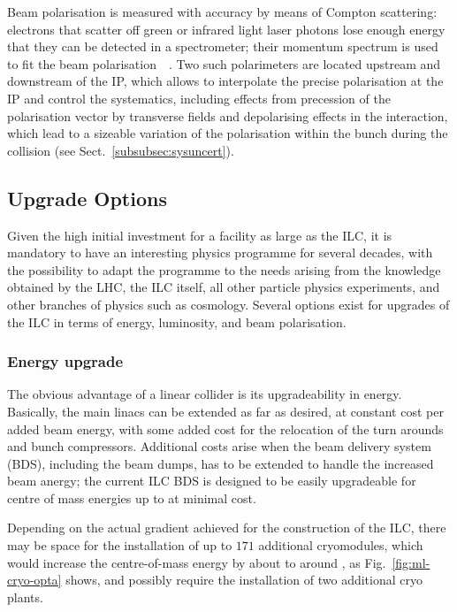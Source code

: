Beam polarisation is measured with  accuracy by means of Compton scattering: electrons that scatter off green or infrared light laser photons lose enough energy that they can be detected in a spectrometer; their momentum spectrum is used to fit the beam polarisation~ \cite{Vormwald:2015hla}.
Two such polarimeters are located  upstream and  downstream of the IP, which allows to interpolate the precise polarisation at the IP and control the systematics, including effects from precession of the polarisation vector by transverse fields and depolarising effects in the interaction, which lead to a sizeable variation of the polarisation within the bunch during the collision (see Sect.~\ref{subsubsec:sysuncert}). 





\subsection{Upgrade Options \label{subsec:upg-opt}}

Given the high initial investment for a facility as large as the ILC, it is mandatory to have an interesting physics programme for several decades, with the possibility to adapt the programme to the needs arising from the knowledge obtained by the LHC, the ILC itself, all other particle physics experiments, and other branches of physics such as cosmology.
Several options exist for upgrades of the ILC in terms of energy, luminosity, and beam polarisation.

\subsubsection{Energy upgrade}
\label{subsubsec:upg-optE}

The obvious advantage of a linear collider is its upgradeability in energy.
Basically, the main linacs can be extended as far as desired, at constant cost per added beam energy, with some added cost for the relocation of the turn arounds and bunch compressors.
Additional costs arise when the beam delivery system (BDS), including the beam dumps, has to be extended to handle the increased beam anergy; 
the current ILC BDS is designed to be easily upgradeable for centre of mass energies up to  at minimal cost.

Depending on the actual gradient achieved for the construction of the ILC, there may be space for the installation of up to $171$ additional cryomodules, which would increase the centre-of-mass energy by about  to around , as Fig.~\ref{fig:ml-cryo-opta} shows, 
and possibly require the installation of two additional cryo plants.

